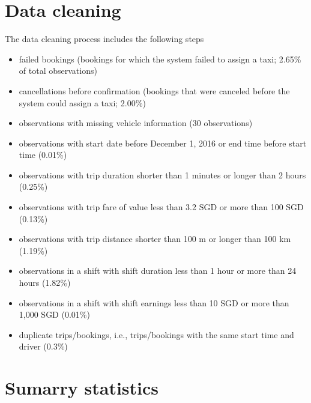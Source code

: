 \documentclass[reviewmode,AEJ]{AEA}
\begin{document}
\begin{appendices}
	
\setcounter{figure}{0}
\renewcommand\thefigure{A\arabic{figure}}
\setcounter{table}{0}
\renewcommand\thetable{A\arabic{table}}


\FloatBarrier

\newpage

\section{Data cleaning}
\label{apx:DataCleaning}
The data cleaning process includes the following steps
\begin{itemize}[noitemsep,nolistsep]
	\item failed bookings (bookings for which the system failed to assign a taxi; 2.65\% of total observations)
	\item cancellations before confirmation (bookings that were canceled before the system could assign a taxi; 2.00\%)
	\item observations with missing vehicle information (30 observations)
	\item observations with start date before December 1, 2016 or end time before start time (0.01\%)
	\item observations with trip duration shorter than 1 minutes or longer than 2 hours (0.25\%)
	\item observations with trip fare of value less than 3.2 SGD or more than 100 SGD (0.13\%)%
	\item observations with trip distance shorter than 100 m or longer than 100 km (1.19\%)%
	\item observations in a shift with shift duration less than 1 hour or more than 24 hours (1.82\%)
	\item observations in a shift with shift earnings less than 10 SGD or more than 1,000 SGD (0.01\%)%
	\item duplicate trips/bookings, i.e., trips/bookings with the same start time and driver (0.3\%)
\end{itemize}

\section{Sumarry statistics}



\end{appendices}
\end{document}
